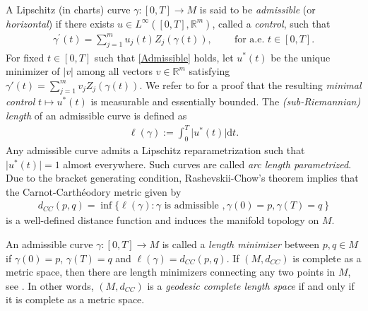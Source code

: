 \documentclass[12pt]{amsart}
\numberwithin{equation}{section}
\theoremstyle{plain}
\theoremstyle{definition}
\theoremstyle{remark}
\begin{document}
A Lipschitz (in charts) curve $\gamma : [0, T] \to M$ is said to be \emph{admissible} (or \emph{horizontal}) if there exists $u \in L^\infty([0,T],\mathbb{R}^m)$, called a \emph{control}, such that
\begin{align}\label{Admissible}
    \gamma^{\prime}(t)=\sum_{j=1}^m u_j(t)Z_j(\gamma(t)), \ \qquad  \text{for a.e. } t\in [ 0, T].
\end{align}
For fixed $t\in[0,T]$ such that \eqref{Admissible} holds, let $u^{\ast}(t)$ be the unique minimizer of $\lvert v \rvert$ among all vectors $v\in \mathbb{R}^m$ satisfying $\gamma'(t)=\sum_{j=1}^mv_jZ_j(\gamma(t))$. We refer to \cite[Chapter~3]{AgrachevBarilariBoscainBook2020} for a proof that the resulting \emph{minimal control} $t\mapsto u^{\ast}(t)$ is measurable and essentially bounded. The \emph{(sub-Riemannian) length} of an admissible curve is defined as
\begin{align*}
    \ell(\gamma):=\int_0^T\lvert u^{\ast}(t)\rvert \text{d}t.
\end{align*}
Any admissible curve admits a Lipschitz reparametrization such that $\lvert u^*(t)\rvert=1$ almost everywhere. Such curves are called \emph{arc length parametrized}. Due to the bracket generating condition, Rashevskii-Chow's theorem \cite[Theorem 3.31]{AgrachevBarilariBoscainBook2020} implies that the Carnot-Carth\'eodory metric given by
\begin{align*}
    d_{CC}\left( p, q \right)=\inf \{\ell(\gamma): \gamma\text{ is admissible }, \gamma(0)=p,\gamma(T)=q\
    \}
\end{align*}
is a well-defined distance function and induces the manifold topology on $M$.

An admissible curve $\gamma:[0,T]\rightarrow M$ is called a \emph{length minimizer} between $p, q \in M$ if $\gamma(0)=p$, $\gamma(T)=q$ and $\ell(\gamma)=d_{CC}\left( p, q \right)$. If $(M,d_{CC})$ is complete as a metric space, then there are length minimizers connecting any two points in $M$, see \cite[Corollary 3.49]{AgrachevBarilariBoscainBook2020}. In other words, $(M,d_{CC})$ is a \emph{geodesic complete length space} if and only if it is complete as a metric space.
\end{document}
